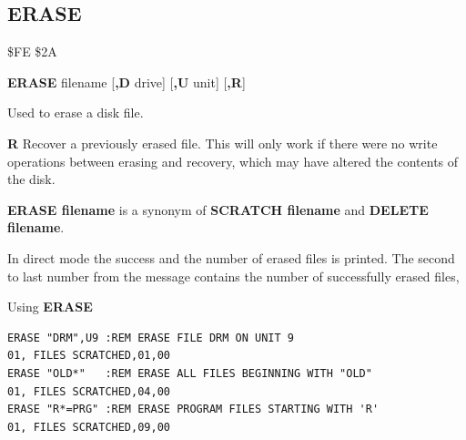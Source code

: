 \subsection{ERASE}
\label{erasecommand}
\begin{description}[leftmargin=2cm,style=nextline]
\item [Token:] \$FE \$2A
\item [Format:] {\bf ERASE} filename [{\bf,D} drive] [{\bf,U} unit] [{\bf,R}]
\item [Usage:] Used to erase a disk file.

   \filenamedefinition

   \drivedefinition

   \unitdefinition

   {\bf R} Recover a previously erased file.
   This will only work if there were no write operations
   between erasing and recovery, which may have altered the
   contents of the disk.

\item [Remarks:] {\bf ERASE filename} is a synonym of {\bf SCRATCH filename}
                  and {\bf DELETE filename}.

   In direct mode the success and the number of erased files is printed.
                 The second to last number from the message
                 contains the number of successfully erased files,

\item [Examples:] Using {\bf ERASE}
\begin{tcolorbox}[colback=black,coltext=white]
\verbatimfont{\codefont}
\begin{verbatim}
ERASE "DRM",U9 :REM ERASE FILE DRM ON UNIT 9
01, FILES SCRATCHED,01,00
ERASE "OLD*"   :REM ERASE ALL FILES BEGINNING WITH "OLD"
01, FILES SCRATCHED,04,00
ERASE "R*=PRG" :REM ERASE PROGRAM FILES STARTING WITH 'R'
01, FILES SCRATCHED,09,00
\end{verbatim}
\end{tcolorbox}
\end{description}


\newpage
